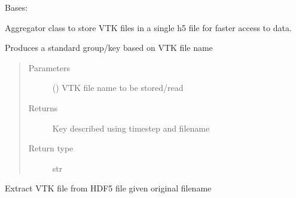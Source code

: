 \documentclass[letterpaper,10pt,english]{sphinxmanual}
\begin{document}
\begin{fulllineitems}
\label{\detokenize{openfdem:openfdem.aggregate_storage.aggregate_storage}}
Bases: 

Aggregator class to store VTK files in a single h5 file for faster access to data.

\begin{fulllineitems}
\label{\detokenize{openfdem:openfdem.aggregate_storage.aggregate_storage.file_group_key}}
Produces a standard group/key based on VTK file name
\begin{quote}\begin{description}
\item[{Parameters}] \leavevmode
{} () \textendash{} VTK file name to be stored/read

\item[{Returns}] \leavevmode
Key described using timestep and filename

\item[{Return type}] \leavevmode
str

\end{description}\end{quote}

\end{fulllineitems}


\begin{fulllineitems}
\label{\detokenize{openfdem:openfdem.aggregate_storage.aggregate_storage.read_file}}
Extract VTK file from HDF5 file given original filename


\end{fulllineitems}
\end{fulllineitems}
\end{document}
